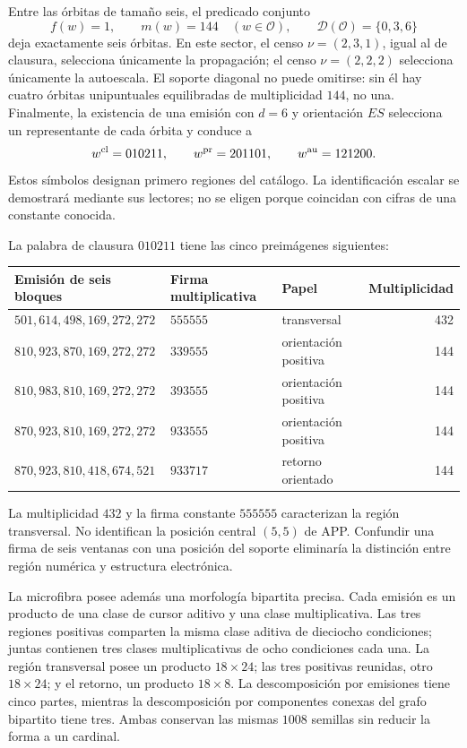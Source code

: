 Entre las órbitas de tamaño seis, el predicado conjunto
\[
 f(w)=1,\qquad m(w)=144\quad(w\in\mathcal O),\qquad
 \mathcal D(\mathcal O)=\{0,3,6\}
\]
deja exactamente seis órbitas. En este sector, el censo \(\nu=(2,3,1)\), igual al de clausura, selecciona únicamente la propagación; el censo \(\nu=(2,2,2)\) selecciona únicamente la autoescala. El soporte diagonal no puede omitirse: sin él hay cuatro órbitas unipuntuales equilibradas de multiplicidad \(144\), no una. Finalmente, la existencia de una emisión con \(d=6\) y orientación \(ES\) selecciona un representante de cada órbita y conduce a
\begin{equation}
 w^{\rm cl}=010211,\qquad w^{\rm pr}=201101,\qquad w^{\rm au}=121200.
 \label{x_reciprocidad:eq:palabras-regionales}
\end{equation}
Estos símbolos designan primero regiones del catálogo. La identificación escalar se demostrará mediante sus lectores; no se eligen porque coincidan con cifras de una constante conocida.

La palabra de clausura \(010211\) tiene las cinco preimágenes siguientes:
\begin{center}\small
\begin{tabular}{@{}lll r@{}}\toprule
Emisión de seis bloques&Firma multiplicativa&Papel&Multiplicidad\\\midrule
\(501,614,498,169,272,272\)&\(555555\)&transversal&432\\
\(810,923,870,169,272,272\)&\(339555\)&orientación positiva&144\\
\(810,983,810,169,272,272\)&\(393555\)&orientación positiva&144\\
\(870,923,810,169,272,272\)&\(933555\)&orientación positiva&144\\
\(870,923,810,418,674,521\)&\(933717\)&retorno orientado&144\\\bottomrule
\end{tabular}
\end{center}
La multiplicidad \(432\) y la firma constante \(555555\) caracterizan la región transversal. No identifican la posición central \((5,5)\) de APP. Confundir una firma de seis ventanas con una posición del soporte eliminaría la distinción entre región numérica y estructura electrónica.

La microfibra posee además una morfología bipartita precisa. Cada emisión es un producto de una clase de cursor aditivo y una clase multiplicativa. Las tres regiones positivas comparten la misma clase aditiva de dieciocho condiciones; juntas contienen tres clases multiplicativas de ocho condiciones cada una. La región transversal posee un producto \(18\times24\); las tres positivas reunidas, otro \(18\times24\); y el retorno, un producto \(18\times8\). La descomposición por emisiones tiene cinco partes, mientras la descomposición por componentes conexas del grafo bipartito tiene tres. Ambas conservan las mismas \(1008\) semillas sin reducir la forma a un cardinal.

